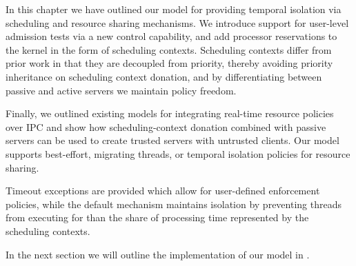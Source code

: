 In this chapter we have outlined our model for providing temporal isolation via scheduling and
resource sharing mechanisms. We introduce support for user-level
admission tests via a new control capability, and add processor reservations to the kernel in the form of scheduling contexts.  
Scheduling contexts differ from prior work in that they are decoupled from priority, thereby
avoiding priority inheritance on scheduling context donation, and by differentiating between passive and active servers we maintain policy freedom.

Finally, we outlined existing models for integrating real-time resource policies over \gls{IPC} and
show how scheduling-context donation combined with passive servers can be used to create trusted
servers with untrusted clients. 
Our model supports best-effort, migrating threads, or temporal isolation policies for resource sharing.

Timeout exceptions are provided which allow for user-defined enforcement policies, while the default
mechanism maintains isolation by preventing threads from executing for than the share of processing
time represented by the scheduling contexts.

In the next section we will outline the implementation of our model in \selfour. 
